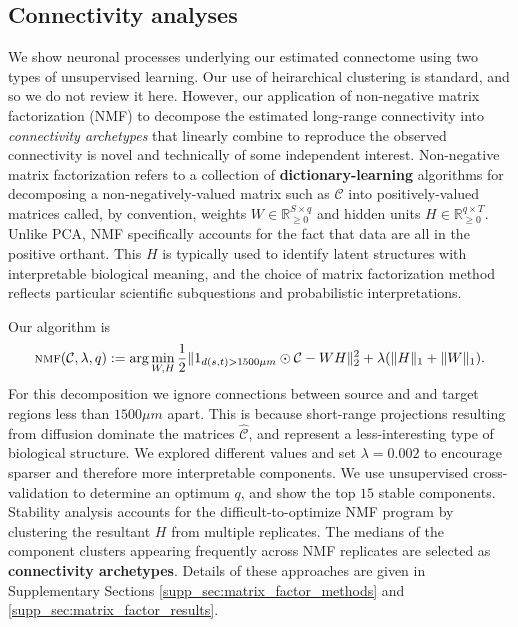 \newpage

\subsection{Connectivity analyses}

We show neuronal processes underlying our estimated connectome using two types of unsupervised learning.
Our use of heirarchical clustering is standard, and so we do not review it here.
However, our application of non-negative matrix factorization (NMF) to decompose the estimated long-range connectivity into \textit{connectivity archetypes} that linearly combine to reproduce the observed connectivity is novel and technically of some independent interest.
Non-negative matrix factorization refers to a collection of \textbf{dictionary-learning} algorithms for decomposing a non-negatively-valued matrix such as $\mathcal C $ into positively-valued matrices called, by convention, weights $W \in \mathbb R^{S \times q}_{\geq 0}$ and hidden units $H \in \mathbb R^{q  \times T}_{\geq 0}$.
Unlike PCA, NMF specifically accounts for the fact that data are all in the positive orthant.
This $H$ is typically used to identify latent structures with interpretable biological meaning, and the choice of matrix factorization method reflects particular scientific subquestions and probabilistic interpretations. 

Our algorithm is 
\begin{eqnarray*}
\label{eq:nmf}
\textsc{nmf}(\mathcal C, \lambda, q) := \arg \min_{W, H} \frac{1}{2}\| 1_{d(s,t) > 1500 \mu m} \odot \mathcal C - WH\|_2^2  + \lambda  (\|H \|_1 + \|W \|_1) .
\end{eqnarray*}
For this decomposition we ignore connections between source and and target regions less than  $1500 \mu m$ apart.
This is because short-range projections resulting from diffusion dominate the matrices $\hat {\mathcal C}$, and represent a less-interesting type of biological structure.
We explored different values and set $\lambda = 0.002$ to encourage sparser and therefore more interpretable components.
We use unsupervised cross-validation to determine an optimum $q$, and show the top $15$ stable components.
Stability analysis accounts for the difficult-to-optimize NMF program by clustering the resultant $H$ from multiple replicates.
The medians of the component clusters appearing frequently across NMF replicates are selected as \textbf{connectivity archetypes}.
Details of these approaches are given in Supplementary Sections \ref{supp_sec:matrix_factor_methods} and \ref{supp_sec:matrix_factor_results}.



